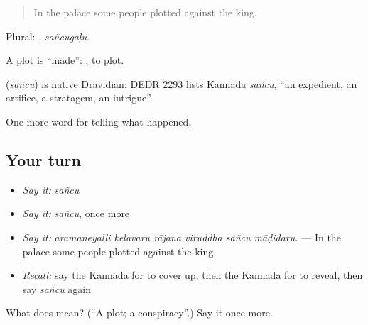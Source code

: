 \begin{quote}
In the palace some people plotted against the king.
\end{quote}

Plural: , \emph{sañcugaḷu}.

A plot is \textquotedblleft{}made\textquotedblright{}:  , to plot.

\begin{cousinweb}
\textbf{} (\emph{sañcu}) is native Dravidian: DEDR 2293 lists Kannada \emph{sañcu}, \textquotedblleft{}an expedient, an artifice, a stratagem, an intrigue\textquotedblright{}.
\end{cousinweb}

\begin{grammarlens}[title={What you've built}]
One more word for telling what happened.
\end{grammarlens}

\subsection*{Your turn}
\begin{itemize}
\raggedright
  \item \emph{Say it:} \emph{sañcu}
  \item \emph{Say it:} \emph{sañcu}, once more
  \item \emph{Say it:} \emph{aramaneyalli kelavaru rājana viruddha sañcu māḍidaru.} — In the palace some people plotted against the king.
  \item \emph{Recall:} say the Kannada for to cover up, then the Kannada for to reveal, then say \emph{sañcu} again
\end{itemize}

\begin{tcolorbox}[breakable,colback=teal!4,colframe=teal!35!black,title={Before you move on}]
What does  mean? (\textquotedblleft{}A plot; a conspiracy\textquotedblright{}.) Say it once more.
\end{tcolorbox}
